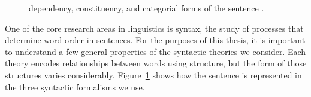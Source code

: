 \begin{figure}
{
  }
  \caption{
  \label{fig:syntax}
  dependency, 
  constituency, 
  and categorial forms of the sentence .
  }
\end{figure}

One of the core research areas in linguistics is syntax, the study of processes that determine word order in sentences.
For the purposes of this thesis, it is important to understand a few general properties of the syntactic theories we consider.
Each theory encodes relationships between words using structure, but the form of those structures varies considerably.
Figure~\ref{fig:syntax} shows how the sentence  is represented in the three syntactic formalisms we use.

